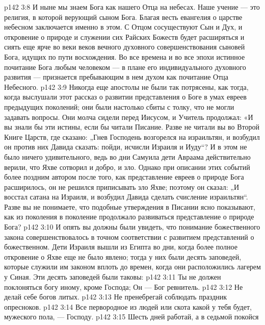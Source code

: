 \vs p142 3:8 \bibnobreakspace {} И ныне мы знаем Бога как нашего Отца на небесах. Наше учение --- это религия, в которой верующий  сыном Бога. Благая весть евангелия о царстве небесном заключается именно в этом. С Отцом сосуществуют Сын и Дух, и откровение о природе и служении сих Райских Божеств будет расширяться и сиять еще ярче во веки веков вечного духовного совершенствования сыновей Бога, идущих по пути восхождения. Во все времена и во все эпохи истинное почитание Бога любым человеком --- в плане его индивидуального духовного развития --- признается пребывающим в нем духом как почитание Отца Небесного.
\vs p142 3:9 \pc Никогда еще апостолы не были так потрясены, как тогда, когда выслушали этот рассказ о развитии представления о Боге в умах евреев предыдущих поколений; они были настолько сбиты с толку, что не могли задавать вопросы. Они молча сидели перед Иисусом, и Учитель продолжал: «И вы знали бы эти истины, если бы читали Писание. Разве не читали вы во Второй Книге Царств, где сказано: „Гнев Господень возгорелся на израильтян, и возбудил он против них Давида сказать: пойди, исчисли Израиля и Иуду“? И в этом не было ничего удивительного, ведь во дни Самуила дети Авраама действительно верили, что Яхве сотворил и добро, и зло. Однако при описании этих событий более поздним автором после того, как представление евреев о природе Бога расширилось, он не решился приписывать зло Яхве; поэтому он сказал: „И восстал сатана на Израиля, и возбудил Давида сделать счисление израильтян“. Разве вы не понимаете, что подобные утверждения в Писании ясно показывают, как из поколения в поколение продолжало развиваться представление о природе Бога?
\vs p142 3:10 И опять вы должны были увидеть, что понимание божественного закона совершенствовалось в точном соответствии с развитием представлений о божественном. Дети Израиля вышли из Египта во дни, когда более полное откровение о Яхве еще не было явлено; тогда у них были десять заповедей, которые служили им законом вплоть до времен, когда они расположились лагерем у Синая. Эти десять заповедей были таковы:
\vs p142 3:11 \bibnobreakspace Ты не должен поклоняться богу иному, кроме Господа; Он --- Бог ревнитель.
\vs p142 3:12 \bibnobreakspace Не делай себе богов литых.
\vs p142 3:13 \bibnobreakspace Не пренебрегай соблюдать праздник опресноков.
\vs p142 3:14 \bibnobreakspace Все первородное из людей или скота какой у тебя будет, мужеского пола, --- Господу.
\vs p142 3:15 \bibnobreakspace Шесть дней работай, а в седьмой покойся
